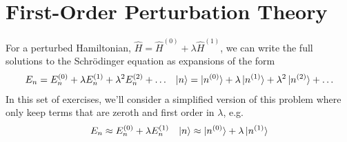%
%
%
%

\section*{First-Order Perturbation Theory}

	For a perturbed Hamiltonian, $\hat H = \hat H^{(0)} + \lambda \hat H^{(1)}$, we can write the full solutions to the Schr\"odinger equation as expansions of the form
	\begin{align*}
		E_n = E_n^{(0)} + \lambda E_n^{(1)} + \lambda^2 E_n^{(2)} + \dots & & \ket{n} = \ket{n^{(0)}} + \lambda\ket{n^{(1)}} + \lambda^2 \ket{n^{(2)}} + \dots
	\end{align*}
	In this set of exercises, we'll consider a simplified version of this problem where only keep terms that are zeroth and first order in $\lambda$, e.g.
	\begin{align*}
		E_n \approx E_n^{(0)} + \lambda E_n^{(1)} & & \ket{n} \approx \ket{n^{(0)}} + \lambda\ket{n^{(1)}}
	\end{align*}


